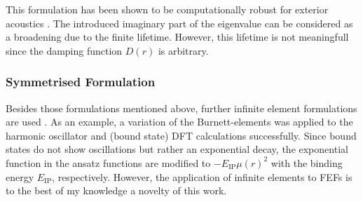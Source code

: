 This formulation has been shown to be computationally robust for exterior acoustics \cite{dreyer_effectiveness,astley_stability}.
The introduced imaginary part of the eigenvalue can be considered as a broadening due to the finite lifetime. %
However, this lifetime is not meaningfull since the damping function $D(r)$ is arbitrary.

\subsubsection{Symmetrised Formulation}
Besides those formulations mentioned above, further infinite element formulations are used \cite{dreyer}.
As an example, a variation of the Burnett-elements was applied to the harmonic oscillator \cite{bettessHarmonic} and (bound state) DFT calculations \cite{sobaMolecule} successfully.
Since bound states do not show oscillations but rather an exponential decay, the exponential function in the ansatz functions are modified to $-E_\text{IP}\mu(r)^2$ with the binding energy $E_\text{IP}$, respectively.
However, the application of infinite elements to FEFs is to the best of my knowledge a novelty of this work.

